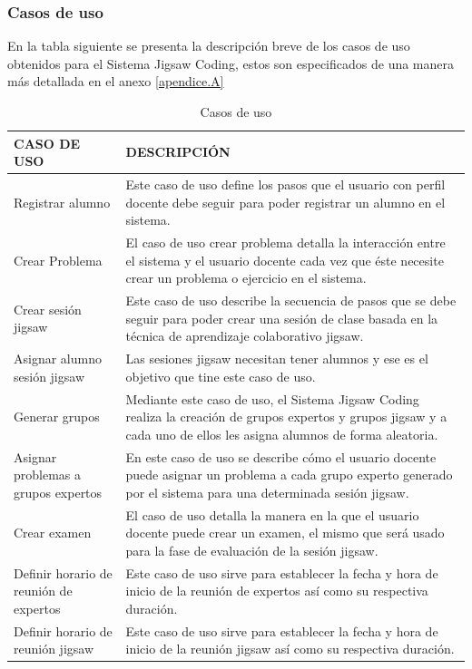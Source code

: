 \subsubsection{Casos de uso}
En la tabla siguiente se presenta la descripción breve de los casos de uso obtenidos para el Sistema Jigsaw Coding, estos son especificados de una manera más detallada en el anexo \ref{apendice.A}\\
\clearpage
\begin{longtable}{|L{4cm}|L{9cm}|}
	\caption{Casos de uso}
	\label{tab:das_casosdeuso}\\
	\hline
	CASO DE USO & DESCRIPCIÓN \\
	\hline
	Registrar alumno & Este caso de uso define los pasos que el usuario con perfil docente debe seguir para poder registrar un alumno en el sistema.\\
	\hline
	Crear Problema & El caso de uso crear problema detalla la interacción entre el sistema y el usuario docente cada vez que éste necesite crear un problema o ejercicio en el sistema.\\
	\hline
	Crear sesión jigsaw & Este caso de uso describe la secuencia de pasos que se debe seguir para poder crear una sesión de clase basada en la técnica de aprendizaje colaborativo jigsaw.\\
	\hline
	Asignar alumno sesión jigsaw & Las sesiones jigsaw necesitan tener alumnos y ese es el objetivo que tine este caso de uso.\\
	\hline
	Generar grupos & Mediante este caso de uso, el Sistema Jigsaw Coding realiza la creación de grupos expertos y grupos jigsaw y a cada uno de ellos les asigna alumnos de forma aleatoria.\\
	\hline
	Asignar problemas a grupos expertos & En este caso de uso se describe cómo el usuario docente puede asignar un problema a cada grupo experto generado por el sistema para una determinada sesión jigsaw.\\
	\hline
	Crear examen & El caso de uso detalla la manera en la que el usuario docente puede crear un examen, el mismo que será usado para la fase de evaluación de la sesión jigsaw.\\
	\hline
	Definir horario de reunión de expertos & Este caso de uso sirve para establecer la fecha y hora de inicio de la reunión de expertos así como su respectiva duración.\\
	\hline
	Definir horario de reunión jigsaw & Este caso de uso sirve para establecer la fecha y hora de inicio de la reunión jigsaw así como su respectiva duración.\\

\end{longtable}
